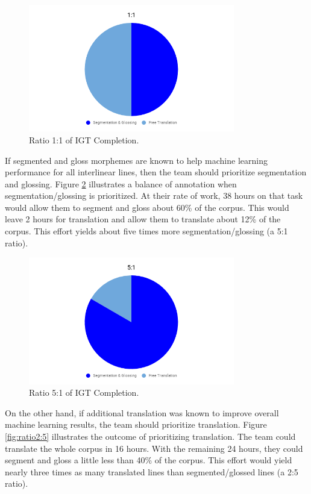 \begin{figure}[H]
    \centering
    \includegraphics[width=9cm]{figs/Ratio1-1.png}
    \caption[Ratio 1:1 of IGT Completion] {Ratio 1:1 of IGT Completion.}
    \label{fig:ratio1:1}
\end{figure}

If segmented and gloss morphemes are known to help machine learning performance for all interlinear lines, then the team should prioritize segmentation and glossing. Figure \ref{fig:ratio5:1} illustrates a balance of annotation when segmentation/glossing is prioritized. At their rate of work, 38 hours on that task would allow them to segment and gloss about 60\% of the corpus. This would leave 2 hours for translation and allow them to translate about 12\% of the corpus. This effort yields about five times more segmentation/glossing (a 5:1 ratio).

\begin{figure}[H]
    \begin{center}
    \includegraphics[width=9cm]{figs/Ratio1-5.png}
    \caption[Ratio 5:1 of IGT Completion] {Ratio 5:1 of IGT Completion.}
    \label{fig:ratio5:1}
    \end{center}
\end{figure}

On the other hand, if additional translation was known to improve overall machine learning results, the team should prioritize translation. Figure \ref{fig:ratio2:5} illustrates the outcome of prioritizing translation. The team could translate the whole corpus in 16 hours. With the remaining 24 hours, they could segment and gloss a little less than 40\% of the corpus. This effort would yield nearly three times as many translated lines than segmented/glossed lines (a 2:5 ratio).


